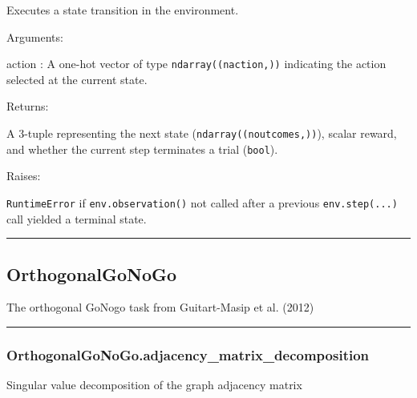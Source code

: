 Executes a state transition in the environment.

Arguments:

action : A one-hot vector of type \texttt{ndarray((naction,))}
indicating the action selected at the current state.

Returns:

A 3-tuple representing the next state (\texttt{ndarray((noutcomes,))}),
scalar reward, and whether the current step terminates a trial
(\texttt{bool}).

Raises:

\texttt{RuntimeError} if \texttt{env.observation()} not called after a
previous \texttt{env.step(...)} call yielded a terminal state.

\begin{center}\rule{0.5\linewidth}{\linethickness}\end{center}

\hypertarget{orthogonalgonogo}{%
\subsection{OrthogonalGoNoGo}\label{orthogonalgonogo}}

\begin{Shaded}
\begin{Highlighting}[]
\end{Highlighting}
\end{Shaded}

The orthogonal GoNogo task from Guitart-Masip et al. (2012)

\begin{center}\rule{0.5\linewidth}{\linethickness}\end{center}

\hypertarget{orthogonalgonogo.adjacency_matrix_decomposition}{%
\subsubsection{OrthogonalGoNoGo.adjacency\_matrix\_decomposition}\label{orthogonalgonogo.adjacency_matrix_decomposition}}

\begin{Shaded}
\begin{Highlighting}[]
\NormalTok{)}
\end{Highlighting}
\end{Shaded}

Singular value decomposition of the graph adjacency matrix

